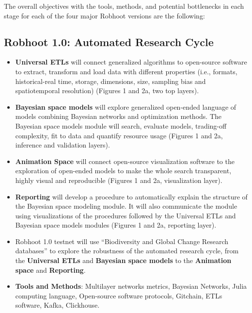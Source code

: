 \documentclass[10pt, a4paper, twocolumn]{article} %
\begin{document}
{  The overall objectives with the tools, methods, and potential
  bottlenecks in each stage for each of the four major Robhoot
  versions are the following: \vspace{-0.15 in}
  \subsection{Robhoot 1.0: Automated Research Cycle}
   \begin{itemize}
   \item {\bf Universal ETLs} will connect generalized algorithms to
     open-source software to extract, transform and load data with
     different properties (i.e., formats, historical-real time,
     storage, dimensions, size, sampling bias and spatiotemporal
     resolution) (Figures 1 and 2a, two top layers).
   \item {\bf Bayesian space models} will explore generalized
     open-ended language of models combining Bayesian networks and
     optimization methods. The Bayesian space models module will
     search, evaluate models, trading-off complexity, fit to data and
     quantify resource usage (Figures 1 and 2a, inference and
     validation layers).
   \item {\bf Animation Space} will connect open-source visualization
     software to the exploration of open-ended models to make the
     whole search transparent, highly visual and reproducible (Figures
     1 and 2a, visualization layer).
   \item {\bf Reporting} will develop a procedure to automatically
     explain the structure of the Bayesian space modeling module. It
     will also communicate the module using visualizations of the
     procedures followed by the Universal ETLs and Bayesian space
     models modules (Figures 1 and 2a, reporting layer).
   \item Robhoot 1.0 testnet will use ``Biodiversity and Global Change
     Research databases'' to explore the robustness of the automated
     research cycle, from the {\bf Universal ETLs} and {\bf Bayesian
       space models} to the {\bf Animation space} and {\bf
       Reporting}.
   \end{itemize}

   \begin{itemize}
   \item {\bf Tools and Methods}: Multilayer networks metrics,
     Bayesian Networks, Julia computing language, Open-source software
     protocols, Gitchain, ETLs software, Kafka, Clickhouse.
 \end{itemize}
 \vspace{-0.15 in}
   
}
\end{document}
